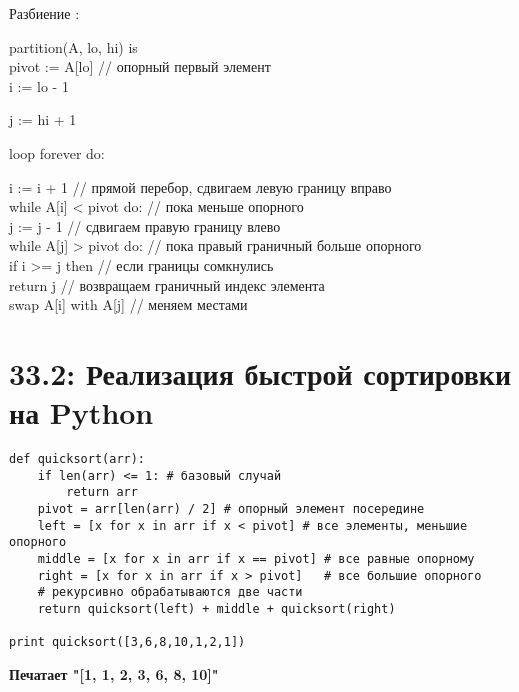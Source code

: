Разбиение :

\vspace{\baselineskip}

\begin{tcolorbox}[breakable,enhanced,before upper={\parindent10pt}]
\noindent partition(A, lo, hi) is\\
pivot := A[lo] // опорный первый элемент\\
i := lo - 1

j := hi + 1

loop forever do:

\indent i := i + 1 // прямой перебор, сдвигаем левую границу вправо\\
\indent while A[i] < pivot do: // пока меньше опорного\\
\indent\indent j := j - 1 // сдвигаем правую границу влево\\
\indent while A[j] > pivot do: // пока правый граничный больше опорного \\
\indent\indent if i >= j then // если границы сомкнулись\\
\indent\indent\indent return j // возвращаем граничный индекс элемента\\
\indent swap A[i] with A[j] // меняем местами\\
\end{tcolorbox}

\section*{33.2: Реализация быстрой сортировки на Python}
\begin{tcolorbox}
\begin{verbatim}
def quicksort(arr):
	if len(arr) <= 1: # базовый случай
		return arr
	pivot = arr[len(arr) / 2] # опорный элемент посередине
	left = [x for x in arr if x < pivot] # все элементы, меньшие опорного
	middle = [x for x in arr if x == pivot] # все равные опорному
	right = [x for x in arr if x > pivot]	# все большие опорного
	# рекурсивно обрабатываются две части
	return quicksort(left) + middle + quicksort(right)

print quicksort([3,6,8,10,1,2,1])
\end{verbatim}
\end{tcolorbox}
\textbf{Печатает "[1, 1, 2, 3, 6, 8, 10]"}
